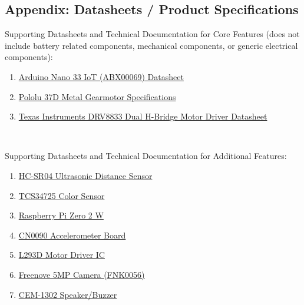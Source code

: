 \documentclass{article}
\begin{document}
\subsection{Appendix: Datasheets / Product Specifications}
Supporting Datasheets and Technical Documentation for Core Features (does not include battery related components, mechanical components, or generic electrical components):

\begin{enumerate}
    \item \href{https://docs.arduino.cc/resources/datasheets/ABX00069-datasheet.pdf}{Arduino Nano 33 IoT (ABX00069) Datasheet}
    \item \href{https://www.pololu.com/file/0J1736/pololu-37d-metal-gearmotors-rev-1-2.pdf}{Pololu 37D Metal Gearmotor Specifications}
    \item \href{https://www.ti.com/lit/ds/symlink/drv8833.pdf?ts=1743785858420}{Texas Instruments DRV8833 Dual H-Bridge Motor Driver Datasheet}
\end{enumerate}

\

Supporting Datasheets and Technical Documentation for Additional Features:
\begin{enumerate}
    \item \href{https://cdn.sparkfun.com/datasheets/Sensors/Proximity/HCSR04.pdf}{HC-SR04 Ultrasonic Distance Sensor}
    \item \href{https://cdn-shop.adafruit.com/datasheets/TCS34725.pdf}{TCS34725 Color Sensor}
    \item \href{https://datasheets.raspberrypi.com/rpizero2/raspberry-pi-zero-2-w-product-brief.pdf}{Raspberry Pi Zero 2 W}
    \item \href{https://mm.digikey.com/Volume0/opasdata/d220001/medias/docus/60/CN0090%20DATASHEET.pdf}{CN0090 Accelerometer Board}
    \item \href{https://www.st.com/content/ccc/resource/technical/document/datasheet/d3/84/d5/f6/3c/23/40/7b/CD00001883.pdf/files/CD00001883.pdf/jcr:content/translations/en.CD00001883.pdf}{L293D Motor Driver IC}
    \item \href{https://store.freenove.com/products/fnk0056}{Freenove 5MP Camera (FNK0056)}
    \item \href{https://www.sameskydevices.com/product/resource/cem-1203-42-.pdf?srsltid=AfmBOorbfJiXs7OIBQN95JLHokXYxTFx0Sd8qTPObMLqcfIHXVElk2uz}{CEM-1302 Speaker/Buzzer}
\end{enumerate}
\end{document}
